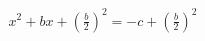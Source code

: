 \documentclass[preview]{standalone}
\begin{document}
\begin{align*}
x^2 + bx + (\frac{b}{2})^2 = -c + (\frac{b}{2})^2
\end{align*}
\end{document}
